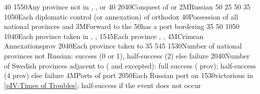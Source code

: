 %
%
{}{40}{}%
%
 {15}{50}{Any province
  not in \regionNorvege, \regionDanemark, \regionFinlande or \regionSuede}%
%
%
{}{40}{}%
%
 
%
%
{20}{40}{Conquest of \payspskov or \paysryazan}%
%
\EUobjective2M{Russian \provinceSmolenska}{}%
{}{50}{}%
%
%
{}{25}{}%
%
%
{}{50}{}%
%
%
{}{35}{}%
%
%
%
{10}{50}{Each diplomatic control (or annexation) of orthodox \MIN}%
%
%
{}{40}{Possession of all national provinces and \provinceSmolenska}%
%
\EUobjective3M{Forward to the \regionBaltique}{}%
{}{50}{\paysmajeurRussie has a port bordering \regionBaltique}%
%
%
{}{35}{}%
%
%
{}{50}{}%
%
%
%
{10}{50}{}%
%
%
%
{10}{40}{Each province taken in \paysmajeurPologne, \paysmajeurLithuanie,
  \paysukraine}%
%
%
{15}{45}{Each province \provinceNeva, \provinceLivonija, \provinceEstland}%
%
\EUobjective4M{Crimean Annexations}{prov}%
{20}{40}{Each province taken to \payscrimee}%
%
%
{}{35}{}%
%
%
%
{5}{45}{}%
%
%
{15}{30}{Number of national provinces not Russian: success (0 or 1),
  half-success (2) else failure}%
%
%
{20}{40}{Number of Swedish provinces adjacent to \regionBaltique (\regionSuede
  and \regionFinlande excepted): full success ( prov);
  half-success (4 prov) else failure}%
%
%
\EUobjective4M{Ports of }{port}%
{20}{50}{Each Russian port on }%
%
%
{15}{30}{\RUS victorious in \ref{pIV:Times of Troubles}; half-success if the
  event does not occur}%
